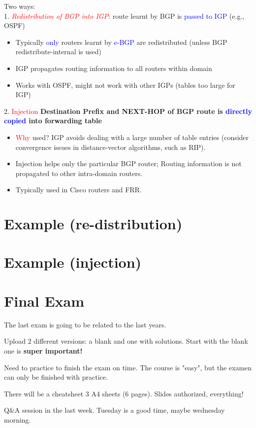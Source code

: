 \documentclass[11pt]{article}
\begin{document}
Two ways: \\

1. \textcolor{red}{\textit{Redistribution of BGP into IGP}}: route learnt by BGP is \textcolor{blue}{passed to IGP} (e.g., OSPF)
\begin{itemize}
	\item Typically \textcolor{blue}{only} routers learnt by \textcolor{blue}{e-BGP} are redistributed (unless BGP redistribute-internal is used)
	\item IGP propagates routing information to all routers within domain
	\item Works with OSPF, might not work with other IGPs (tables too large for IGP)
\end{itemize}

2. \textcolor{red}{Injection} \textbf{Destination Prefix and NEXT-HOP of BGP route is \textcolor{blue}{directly copied} into forwarding table}
\begin{itemize}
	\item \textcolor{red}{Why} used? IGP avoids dealing with a large number of table entries (consider convergence issues in distance-vector algorithms, such as RIP).
	\item Injection helps only the particular BGP router; Routing information is not propagated to other intra-domain routers. 
	\item Typically used in Cisco routers and FRR. 
\end{itemize}

\section*{Example (re-distribution)}

\section*{Example (injection)}

\section*{Final Exam}

The last exam is going to be related to the last years. 

Upload 2 different versions: a blank and one with solutions. Start with the blank one is \textbf{super important!}

Need to practice to finish the exam on time. The course is "easy", but the examen can only be finished with practice.

There will be a cheatsheet 3 A4 sheets (6 pages). Slides authorized, everything!

Q&A session in the last week. Tuesday is a good time, maybe wednesday morning.  
\end{document}
